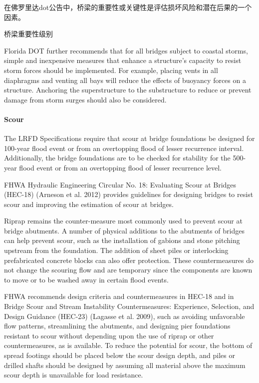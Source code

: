 在佛罗里达\acrlong*{dot}公告中，桥梁的重要性或关键性是评估损坏风险和潜在后果的一个因素。

\begin{table}
  \caption{桥梁重要性级别}
  \label{tab:bridge-importance-level}
  
\end{table}

Florida DOT further recommends that for all bridges subject to coastal storms, simple and inexpensive measures that enhance a structure’s capacity to resist storm forces should be implemented. For example, placing vents in all diaphragms and venting all bays will reduce the effects of buoyancy forces on a structure. Anchoring the superstructure to the substructure to reduce or prevent damage from storm surges should also be considered.


\paragraph*{Scour}
The LRFD Specifications require that scour at bridge foundations be designed for 100-year flood event or from
an overtopping flood of lesser recurrence interval. Additionally, the bridge foundations are to be checked for
stability for the 500-year flood event or from an overtopping flood of lesser recurrence level.

FHWA Hydraulic Engineering Circular No. 18: Evaluating Scour at Bridges (HEC-18) (Arneson et al. 2012)
provides guidelines for designing bridges to resist scour and improving the estimation of scour at bridges.

Riprap remains the counter-measure most commonly used to prevent scour at bridge abutments. A number of
physical additions to the abutments of bridges can help prevent scour, such as the installation of gabions and stone
pitching upstream from the foundation. The addition of sheet piles or interlocking prefabricated concrete blocks can also offer protection. These countermeasures do not change the scouring flow and are temporary since the
components are known to move or to be washed away in certain flood events.

FHWA recommends design criteria and countermeasures in HEC-18 and in Bridge Scour and Stream Instability Countermeasures: Experience, Selection, and Design Guidance (HEC-23) (Lagasse et al. 2009), such as avoiding unfavorable flow patterns, streamlining the abutments, and designing pier foundations resistant to scour without depending upon the use of riprap or other countermeasures, as is available. To reduce the potential for scour, the bottom of spread footings should be placed below the scour design depth, and piles or drilled shafts should be designed by assuming all material above the maximum scour depth is unavailable for load resistance.

